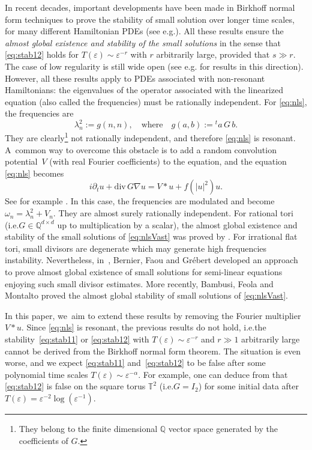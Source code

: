 \documentclass[10pt,a4paper]{amsart}
\providecommand{\ie}{i.e.}
\providecommand{\eg}{e.g.}
\theoremstyle{plain}
\theoremstyle{definition}
\newcommand{\1}{\mathbf{1}}
\begin{document}
In recent decades, important developments have been made in Birkhoff normal form techniques to prove the stability of small solution over longer time scales, for many different Hamiltonian PDEs (see \eg \cite{BG06,BDGS07,GIP,Del12,FGL13,BD17,BMM22}). All these results ensure the \emph{almost global existence and stability of the small solutions} in the sense that \eqref{eq:stab12} holds for $T(\varepsilon) \sim \varepsilon^{-r}$ with $r$ arbitrarily large, provided that $s\gg r$. The case of low regularity is still wide open (see \eg \cite{BG22,BGR23} for results in this direction). However, all these results apply to PDEs associated with non-resonant Hamiltonians: the eigenvalues of the operator associated with the linearized equation (also called the frequencies) must be rationally independent. For \eqref{eq:nls}, the frequencies are
\[
\lambda_n^2:= g(n,n), \quad \mathrm{where} \quad g(a,b):={} ^t\!a\,G\, b.
\]
They are clearly\footnote{They belong to the finite dimensional $\mathbb{Q}$ vector space generated by the coefficients of $G$.} not rationally independent, and therefore \eqref{eq:nls} is resonant. A~common way to overcome this obstacle is to add a random convolution potential~$V$ (with real Fourier coefficients) to the equation, and the equation \eqref{eq:nls} becomes
\begin{equation}
\label{eq:nlsVast}
\tag{NLS*}
i\partial_{t}u + \mathrm{div} \, G \nabla u = V\ast u+ f(|u|^{2})u.
\end{equation}
See for example \cite{BG06,YZ14,FI19,BMP20,BG22,BFM22}. In this case, the frequencies are modulated and become $\omega_n = \lambda_n^2+ V_n$. They are almost surely rationally independent. For rational tori (\ie $G\in \mathbb{Q}^{d\times d}$ up to multiplication by a scalar), the almost global existence and stability of the small solutions of \eqref{eq:nlsVast} was proved by \cite{BG06}. For irrational flat tori, small divisors are degenerate which may generate high frequencies instability. Nevertheless, in~\cite{BFG20b}, Bernier, Faou and Grébert developed an approach to prove almost global existence of small solutions for semi-linear equations enjoying such small divisor estimates. More recently, Bambusi, Feola and Montalto \cite{BFM22} proved the almost global stability of small solutions of \eqref{eq:nlsVast}.

In this paper, we~aim to extend these results by removing the Fourier multiplier $V\ast u$. Since \eqref{eq:nls} is resonant, the previous results do not hold, \ie the stability~\eqref{eq:stab11} or \eqref{eq:stab12} with $T(\varepsilon) \sim \varepsilon^{-r}$ and $r\gg1$ arbitrarily large cannot be derived from the Birkhoff normal form theorem. The situation is even worse, and we expect \eqref{eq:stab11} and~\eqref{eq:stab12} to be false after some polynomial time scales $T(\varepsilon) \sim \varepsilon^{-\alpha}$. For example, one can deduce from \cite{CKSTT} that \eqref{eq:stab12} is false on the square torus $\mathbb{T}^2$ (\ie $G= I_2$) for some initial data after $T(\varepsilon)=\varepsilon^{-2} \log(\varepsilon^{-1})$.
\end{document}
